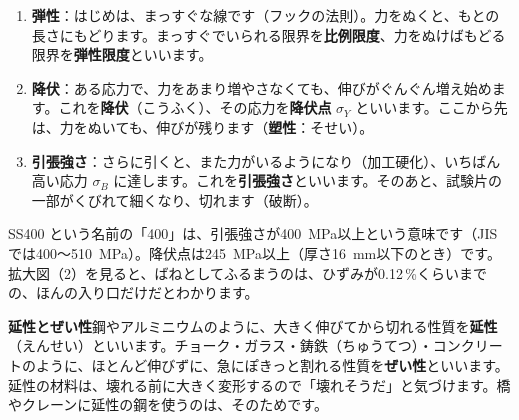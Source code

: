 \begin{enumerate}[label={\bkcircled{\arabic*}}, leftmargin=2.4\zw, itemsep=2pt, topsep=2pt]
\item \textbf{弾性}：はじめは、まっすぐな線です（フックの法則）。力をぬくと、もとの長さにもどります。まっすぐでいられる限界を\textbf{比例限度}、力をぬけばもどる限界を\textbf{弾性限度}といいます。
\item \textbf{降伏}：ある応力で、力をあまり増やさなくても、伸びがぐんぐん増え始めます。これを\textbf{降伏}（こうふく）、その応力を\textbf{降伏点} $\sigma_Y$ といいます。ここから先は、力をぬいても、伸びが残ります（\textbf{塑性}：そせい）。
\item \textbf{引張強さ}：さらに引くと、また力がいるようになり（加工硬化）、いちばん高い応力 $\sigma_B$ に達します。これを\textbf{引張強さ}といいます。そのあと、試験片の一部がくびれて細くなり、切れます（破断）。
\end{enumerate}
SS400 という名前の「400」は、引張強さが\qty{400}{MPa}以上という意味です（JIS では400〜\qty{510}{MPa}）。降伏点は\qty{245}{MPa}以上（厚さ\qty{16}{mm}以下のとき）です。拡大図（2）を見ると、ばねとしてふるまうのは、ひずみが0.12\,\%くらいまでの、ほんの入り口だけだとわかります。

\noindent\textbf{延性とぜい性}\quad 鋼やアルミニウムのように、大きく伸びてから切れる性質を\textbf{延性}（えんせい）といいます。チョーク・ガラス・鋳鉄（ちゅうてつ）・コンクリートのように、ほとんど伸びずに、急にぽきっと割れる性質を\textbf{ぜい性}といいます。延性の材料は、壊れる前に大きく変形するので「壊れそうだ」と気づけます。橋やクレーンに延性の鋼を使うのは、そのためです。

